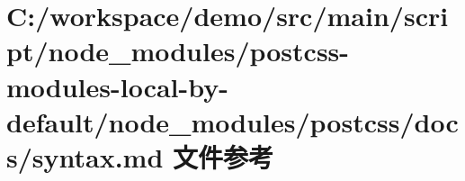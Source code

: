 \hypertarget{postcss-modules-local-by-default_2node__modules_2postcss_2docs_2syntax_8md}{}\section{C\+:/workspace/demo/src/main/script/node\+\_\+modules/postcss-\/modules-\/local-\/by-\/default/node\+\_\+modules/postcss/docs/syntax.md 文件参考}
\label{postcss-modules-local-by-default_2node__modules_2postcss_2docs_2syntax_8md}
